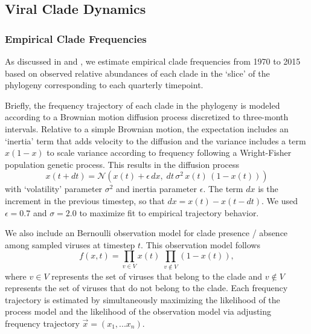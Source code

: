 \documentclass[11pt,oneside,letterpaper]{article}
\begin{document}
\subsection*{Viral Clade Dynamics}
\subsubsection*{Empirical Clade Frequencies}
As discussed in \citet{neher2016prediction} and \citet{lee2018deep}, we estimate empirical clade frequencies from 1970 to 2015 based on observed relative abundances of each clade in the `slice' of the phylogeny corresponding to each quarterly timepoint.

Briefly, the frequency trajectory of each clade in the phylogeny is modeled according to a Brownian motion diffusion process discretized to three-month intervals.
Relative to a simple Brownian motion, the expectation includes an `inertia' term that adds velocity to the diffusion and the variance includes a term $x(1-x)$ to scale variance according to frequency following a Wright-Fisher population genetic process.
This results in the diffusion process
\begin{equation}
  \label{eq_estimate_frequency}
x(t+dt) = \mathcal{N}\left(x(t) + \epsilon \, dx, \; dt \, \sigma^2 \, x(t) \, (1-x(t))\right)
\end{equation}
with `volatility' parameter $\sigma^2$ and inertia parameter $\epsilon$.
The term $dx$ is the increment in the previous timestep, so that $dx = x(t) - x(t-dt)$.
We used $\epsilon = 0.7$ and $\sigma = 2.0$ to maximize fit to empirical trajectory behavior.

We also include an Bernoulli observation model for clade presence / absence among sampled viruses at timestep $t$.
This observation model follows
\begin{equation}
f(x,t) = \prod_{v \in V} x(t) \; \prod_{v \notin V} (1-x(t)),
\end{equation}
where $v \in V$ represents the set of viruses that belong to the clade and $v \notin V$ represents the set of viruses that do not belong to the clade.
Each frequency trajectory is estimated by simultaneously maximizing the likelihood of the process model and the likelihood of the observation model via adjusting frequency trajectory $\vec{x} = (x_1, ... x_n)$.
\end{document}
